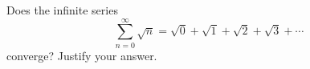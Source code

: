 Does the infinite series
\[\sum_{n=0}^{\infty}\sqrt n=\sqrt0+\sqrt1+\sqrt2+\sqrt3+\cdots\]
converge? Justify your answer.
